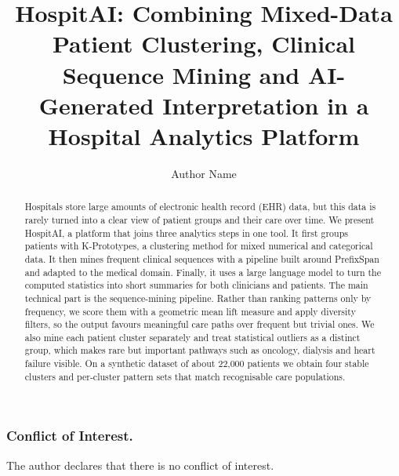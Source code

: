 \documentclass[runningheads]{llncs}
\begin{document}
\title{HospitAI: Combining Mixed-Data Patient Clustering, Clinical Sequence Mining and AI-Generated Interpretation in a Hospital Analytics Platform}

\author{Author Name}

\maketitle

\begin{abstract}
Hospitals store large amounts of electronic health record (EHR) data, but this data is rarely turned into a clear view of patient groups and their care over time. We present HospitAI, a platform that joins three analytics steps in one tool. It first groups patients with K-Prototypes, a clustering method for mixed numerical and categorical data. It then mines frequent clinical sequences with a pipeline built around PrefixSpan and adapted to the medical domain. Finally, it uses a large language model to turn the computed statistics into short summaries for both clinicians and patients. The main technical part is the sequence-mining pipeline. Rather than ranking patterns only by frequency, we score them with a geometric mean lift measure and apply diversity filters, so the output favours meaningful care paths over frequent but trivial ones. We also mine each patient cluster separately and treat statistical outliers as a distinct group, which makes rare but important pathways such as oncology, dialysis and heart failure visible. On a synthetic dataset of about 22{,}000 patients we obtain four stable clusters and per-cluster pattern sets that match recognisable care populations.

\end{abstract}










\subsubsection*{Conflict of Interest.}
The author declares that there is no conflict of interest.
\end{document}
